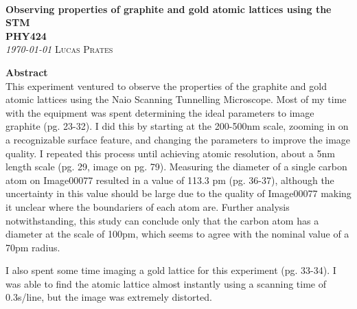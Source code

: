 \documentclass[11pt]{article}
\newcommand{\CourseDef}{PHY424} %
\newcommand{\TitleDef}{Observing properties of graphite and gold atomic lattices using the STM} %
\newcommand{\AuthorDef}{Lucas Prates} %
\begin{document}
\thispagestyle{plain}
{\noindent\Huge\bf  \\[0.5\baselineskip] {\selectfont  \TitleDef}         }\\[2\baselineskip] %
{ {\bf {}\selectfont \CourseDef}\\ {\textit{\selectfont     \today}}}\hspace{150pt}    {\large \textsc{\AuthorDef}} %
\\[1.4\baselineskip]
\vspace{-15pt}


\textbf{Abstract}\\
This experiment ventured to observe the properties of the graphite and gold atomic 
lattices using the Naio Scanning Tunnelling Microscope. Most of my time with the
equipment was spent determining the ideal parameters to image graphite (pg. 23-32). I did this by 
starting at the 200-500nm scale, zooming in on a recognizable surface feature, and 
changing the parameters to improve the image quality. I repeated this process until
achieving atomic resolution, about a 5nm length scale (pg. 29, image on pg. 79). Measuring the diameter of a single
carbon atom on Image00077 resulted in a value of 113.3 pm (pg. 36-37), although the
uncertainty in this value should be large due to the quality of Image00077 making it 
unclear where the boundariers of each atom are. Further analysis notwithstanding, this 
study can conclude only that the carbon atom has a diameter at the scale of 100pm, which 
seems to agree with the nominal value of a 70pm radius. 

I also spent some time imaging a gold lattice for this experiment (pg. 33-34). I was able 
to find the atomic lattice almost instantly using a scanning time of 0.3s/line, but the
image was extremely distorted.
\end{document}
